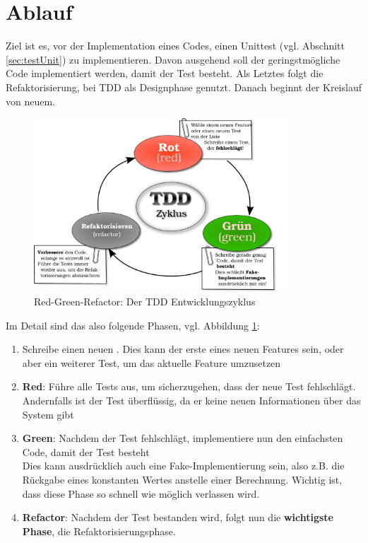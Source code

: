 \section{Ablauf}
  Ziel ist es, vor der Implementation eines Codes, einen Unittest (vgl. Abschnitt \ref{sec:testUnit}) zu implementieren. Davon ausgehend soll der geringstmögliche Code implementiert werden, damit der Test besteht. Als Letztes folgt die Refaktorisierung, bei TDD als Designphase genutzt. Danach beginnt der Kreislauf von neuem.

  \begin{figure}[htbp]
 \centering
 \includegraphics[width=0.85\textwidth]{./diagrams/red-green-refactor.pdf}
 \caption{Red-Green-Refactor: Der TDD Entwicklungszyklus}
  \label{fig:redgreenrefactor}
\end{figure}
  Im Detail sind das also folgende Phasen, vgl. Abbildung \ref{fig:redgreenrefactor}:
  \begin{enumerate}
   \item Schreibe einen neuen . Dies kann der erste eines neuen Features sein, oder aber ein weiterer Test, um das aktuelle Feature umzusetzen
   \item \textbf{Red}: Führe alle Tests aus, um sicherzugehen, dass der neue Test fehlschlägt. Andernfalls ist der Test überflüssig, da er keine neuen Informationen über das System gibt
   \item \textbf{Green}: Nachdem der Test fehlschlägt, implementiere nun den einfachsten Code, damit der Test besteht\\
   Dies kann ausdrücklich auch eine Fake-Implementierung sein, also z.B. die Rückgabe eines konstanten Wertes anstelle einer Berechnung. Wichtig ist, dass diese Phase so schnell wie möglich verlassen wird.
   \item \textbf{Refactor}: Nachdem der Test bestanden wird, folgt nun die \textbf{wichtigste Phase}, die Refaktorisierungsphase.\\
  \end{enumerate}


